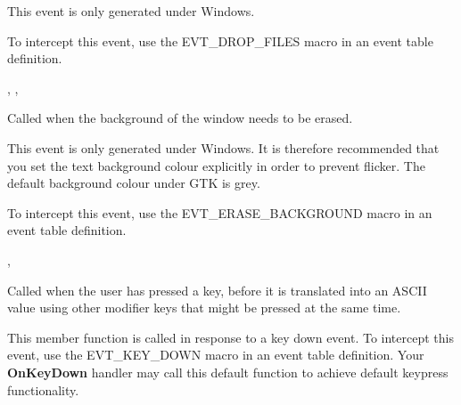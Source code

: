 This event is only generated under Windows.

To intercept this event, use the EVT\_DROP\_FILES macro in an event table definition.


, ,\rtfsp
{}

\label{wxwindowonerasebackground}


Called when the background of the window needs to be erased.




This event is only generated under Windows. It is therefore recommended that
you set the text background colour explicitly in order to prevent flicker.
The default background colour under GTK is grey.

To intercept this event, use the EVT\_ERASE\_BACKGROUND macro in an event table definition.


, 

\label{wxwindowonkeydown}


Called when the user has pressed a key, before it is translated into an ASCII value using other
modifier keys that might be pressed at the same time.




This member function is called in response to a key down event. To intercept this event,
use the EVT\_KEY\_DOWN macro in an event table definition. Your {\bf OnKeyDown} handler may call this
default function to achieve default keypress functionality.

